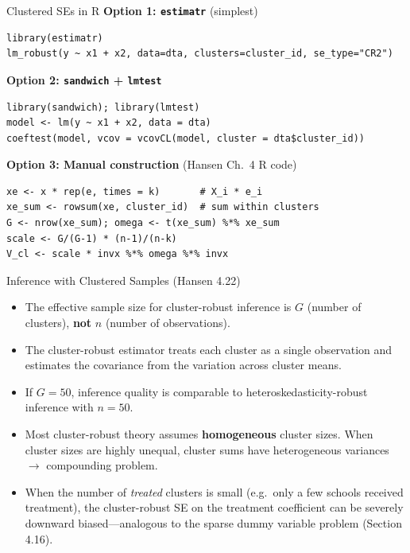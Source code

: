 \documentclass[aspectratio=169, handout, t]{beamer}
\numberwithin{equation}{section}
\begin{document}
\begin{frame}[fragile]{Clustered SEs in R}
\textbf{Option 1: \texttt{estimatr}} (simplest)
\begin{lstlisting}
library(estimatr)
lm_robust(y ~ x1 + x2, data=dta, clusters=cluster_id, se_type="CR2")
\end{lstlisting}\pause
\vspace{-2pt}
\textbf{Option 2: \texttt{sandwich} + \texttt{lmtest}}
\begin{lstlisting}
library(sandwich); library(lmtest)
model <- lm(y ~ x1 + x2, data = dta)
coeftest(model, vcov = vcovCL(model, cluster = dta$cluster_id))
\end{lstlisting}\pause
\vspace{-2pt}
\textbf{Option 3: Manual construction} (Hansen Ch.\ 4 R code)
\begin{lstlisting}
xe <- x * rep(e, times = k)       # X_i * e_i
xe_sum <- rowsum(xe, cluster_id)  # sum within clusters
G <- nrow(xe_sum); omega <- t(xe_sum) %*% xe_sum
scale <- G/(G-1) * (n-1)/(n-k)
V_cl <- scale * invx %*% omega %*% invx
\end{lstlisting}
\end{frame}

\begin{frame}{Inference with Clustered Samples (Hansen 4.22)}
\begin{itemize}
\item The \alert{effective sample size} for cluster-robust inference is $G$ (number of clusters), \textbf{not} $n$ (number of observations). \pause
\item The cluster-robust estimator treats each cluster as a single observation and estimates the covariance from the variation across cluster means. \pause
\item If $G=50$, inference quality is comparable to heteroskedasticity-robust inference with $n=50$. \pause
\item Most cluster-robust theory assumes \textbf{homogeneous} cluster sizes.  When cluster sizes are highly unequal, cluster sums have heterogeneous variances $\rightarrow$ compounding problem. \pause
\item When the number of \emph{treated} clusters is small (e.g.\ only a few schools received treatment), the cluster-robust SE on the treatment coefficient can be severely downward biased---analogous to the sparse dummy variable problem (Section 4.16).
\end{itemize}
\end{frame}
\end{document}
